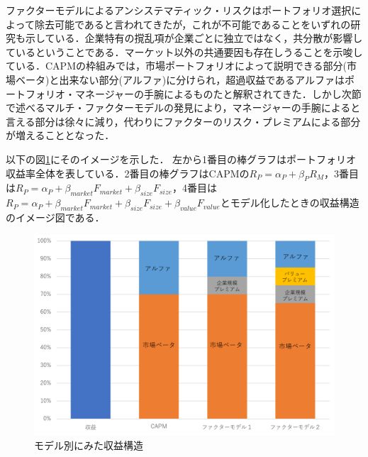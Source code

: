 ﻿\documentclass[11pt]{jreport}
\begin{document}
ファクターモデルによるアンシステマティック・リスクはポートフォリオ選択によって除去可能であると言われてきたが，これが不可能であることをいずれの研究も示している．企業特有の撹乱項が企業ごとに独立ではなく，共分散が影響しているということである．マーケット以外の共通要因も存在しうることを示唆している．CAPMの枠組みでは，市場ポートフォリオによって説明できる部分(市場ベータ)と出来ない部分(アルファ)に分けられ，超過収益であるアルファはポートフォリオ・マネージャーの手腕によるものたと解釈されてきた．しかし次節で述べるマルチ・ファクターモデルの発見により，マネージャーの手腕によると言える部分は徐々に減り，代わりにファクターのリスク・プレミアムによる部分が増えることとなった．

以下の図\ref{fig:beta}にそのイメージを示した．
左から1番目の棒グラフはポートフォリオ収益率全体を表している．2番目の棒グラフはCAPMの$R_P=\alpha_P + \beta_PR_M$，3番目は$R_P = \alpha_P + \beta_{market}F_{market} + \beta_{size}F_{size}$，4番目は$R_P = \alpha_P + \beta_{market}F_{market} + \beta_{size}F_{size} + \beta_{value}F_{value}$とモデル化したときの収益構造のイメージ図である．

\begin{figure}[H]
	\begin{center}
		\includegraphics[width=14cm]{./fig/beta}
		\caption{モデル別にみた収益構造}
		\label{fig:beta}
	\end{center}
\end{figure}
\end{document}
